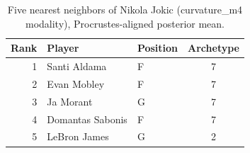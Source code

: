 \begin{table}[htbp]
  \centering\small
  \begin{tabular}{rllc}
    \toprule
    Rank & Player & Position & Archetype \\
    \midrule
    1 & Santi Aldama & F & 7 \\
    2 & Evan Mobley & F & 7 \\
    3 & Ja Morant & G & 7 \\
    4 & Domantas Sabonis & F & 7 \\
    5 & LeBron James & G & 2 \\
    \bottomrule
  \end{tabular}
  \caption{Five nearest neighbors of Nikola Jokic (curvature_m4 modality), Procrustes-aligned posterior mean.}
  \label{tab:Nikola_Jokic_neighbors_curvature_m4}
\end{table}

